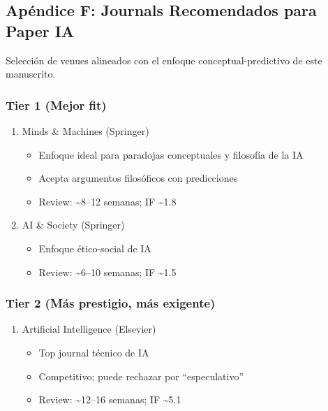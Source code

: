 \subsection{Apéndice F: Journals Recomendados para Paper
IA}\label{apuxe9ndice-f-journals-recomendados-para-paper-ia}

Selección de venues alineados con el enfoque conceptual-predictivo de
este manuscrito.

\subsubsection{Tier 1 (Mejor fit)}\label{tier-1-mejor-fit}

\begin{enumerate}
\def\labelenumi{\arabic{enumi}.}
\tightlist
\item
  Minds \& Machines (Springer)

  \begin{itemize}
  \tightlist
  \item
    Enfoque ideal para paradojas conceptuales y filosofía de la IA
  \item
    Acepta argumentos filosóficos con predicciones
  \item
    Review: \textasciitilde8--12 semanas; IF \textasciitilde1.8
  \end{itemize}
\item
  AI \& Society (Springer)

  \begin{itemize}
  \tightlist
  \item
    Enfoque ético-social de IA
  \item
    Review: \textasciitilde6--10 semanas; IF \textasciitilde1.5
  \end{itemize}
\end{enumerate}

\subsubsection{Tier 2 (Más prestigio, más
exigente)}\label{tier-2-muxe1s-prestigio-muxe1s-exigente}

\begin{enumerate}
\def\labelenumi{\arabic{enumi}.}
\setcounter{enumi}{2}
\tightlist
\item
  Artificial Intelligence (Elsevier)

  \begin{itemize}
  \tightlist
  \item
    Top journal técnico de IA
  \item
    Competitivo; puede rechazar por ``especulativo''
  \item
    Review: \textasciitilde12--16 semanas; IF \textasciitilde5.1
  \end{itemize}
\end{enumerate}

